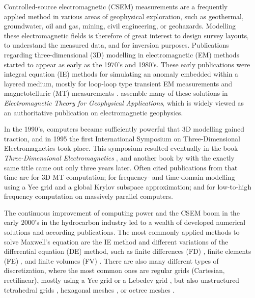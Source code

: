 \documentclass[
    paper,
  ]{geophysics}
\begin{document}
Controlled-source electromagnetic (CSEM) measurements are a frequently applied method in various areas of geophysical exploration, such as geothermal, groundwater, oil and gas, mining, civil engineering, or geohazards. Modelling these electromagnetic fields is therefore of great interest to design survey layouts, to understand the measured data, and for inversion purposes. Publications regarding three-dimensional (3D) modelling in electromagnetic (EM) methods started to appear as early as the 1970's and 1980's. These early publications were integral equation (IE) methods for simulating an anomaly embedded within a layered medium, mostly for loop-loop type transient EM measurements  \citep{GJI.74.Raiche, GEO.75.Hohmann, GJI.82.Das, GEO.86.Newman} and magnetotelluric (MT) measurements \citep{GEO.84.Wannamaker}. \cite{B.SEG.88.Ward} assemble many of these solutions in \emph{Electromagnetic Theory for Geophysical Applications}, which is widely viewed as an authoritative publication on electromagnetic geophysics.

In the 1990's, computers became sufficiently powerful that 3D modelling gained traction, and in 1995 the first International Symposium on Three-Dimensional Electromagnetics took place. This symposium resulted eventually in the book \emph{Three-Dimensional Electromagnetics} \citep{B.SEG.99.Oristaglio}, and another book by \cite{B.02.Wannamaker} with the exactly same title came out only three years later. Often cited publications from that time are \cite{RSC.94.Mackie} for 3D MT computation; \cite{RS.94.Druskin} for frequency- and time-domain modelling using a Yee grid and a global Krylov subspace approximation; and \cite{RS.96.Alumbaugh, GJI.97.Newman} for low-to-high frequency computation on massively parallel computers.

The continuous improvement of computing power and the CSEM boom in the early 2000's in the hydrocarbon industry led to a wealth of developed numerical solutions and according publications. The most commonly applied methods to solve Maxwell's equation are the IE method \citep{GJI.74.Raiche, RS.02.Hursan, GEO.06.Zhdanov, GP.10.Tehrani, CAG.16.Kruglyakov, MGS.17.Kruglyakov} and different variations of the differential equation (DE) method, such as finite differences (FD) \citep{GEO.93.Wang, RS.94.Druskin, RSC.94.Mackie, GEO.09.Streich, CAG.13.Sommer}, finite elements (FE) \citep{GEO.04.Commer, GJI.11.Schwarzbach,GEO.12.daSilva, GJI.13.Grayver, GJI.13.Puzyrev, SEG.16.Zhang}, and finite volumes (FV) \citep{EM.90.Madsen, SIAM.01.Haber, PIER.01.Clemens, GEO.14.Jahandari}. There are also many different types of discretization, where the most common ones are regular grids (Cartesian, rectilinear), mostly using a Yee grid \citep{IEEE.66.Yee} or a Lebedev grid \citep{CMMP.64.Lebedev}, but also unstructured tetrahedral grids \citep{SEG.16.Zhang, CAG.17.Cai}, hexagonal meshes \citep{CAG.14.Cai}, or octree meshes \citep{ECP.07.Haber}.
\end{document}
